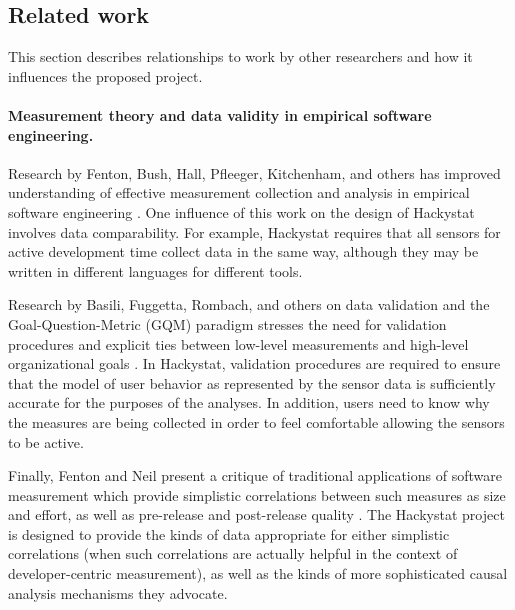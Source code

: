 

\subsection{Related work}

This section describes relationships to work by other researchers and how
it influences the proposed project.

\vspace*{-.15in} \paragraph{Measurement theory and data validity in empirical software
  engineering.}  

Research by Fenton, Bush, Hall, Pfleeger, Kitchenham, and others has
improved understanding of effective measurement collection and analysis in
empirical software engineering
\cite{Bush90,Fenton97,Hall97,Kitchenham01,Kitchenham95,Pfleeger97}. One
influence of this work on the design of Hackystat involves data
comparability.  For example, Hackystat requires that all sensors for active
development time collect data in the same way, although they may be written
in different languages for different tools.

Research by Basili, Fuggetta, Rombach, and others on data validation and
the Goal-Question-Metric (GQM) paradigm stresses the need for validation
procedures and explicit ties between low-level measurements and high-level
organizational goals \cite{Basili88,Basili94,Birk98,Fuggetta98,Solingen99}.
In Hackystat, validation procedures are required to ensure that the model
of user behavior as represented by the sensor data is sufficiently accurate
for the purposes of the analyses.  In addition, users need to know why the
measures are being collected in order to feel comfortable allowing the
sensors to be active.

Finally, Fenton and Neil present a critique of traditional applications of
software measurement which provide simplistic correlations between such
measures as size and effort, as well as pre-release and
post-release quality \cite{Fenton00}. The Hackystat project is designed to
provide the kinds of data appropriate for either simplistic correlations
(when such correlations are actually helpful in the context of
developer-centric measurement), as well as the kinds of more sophisticated
causal analysis mechanisms they advocate.

